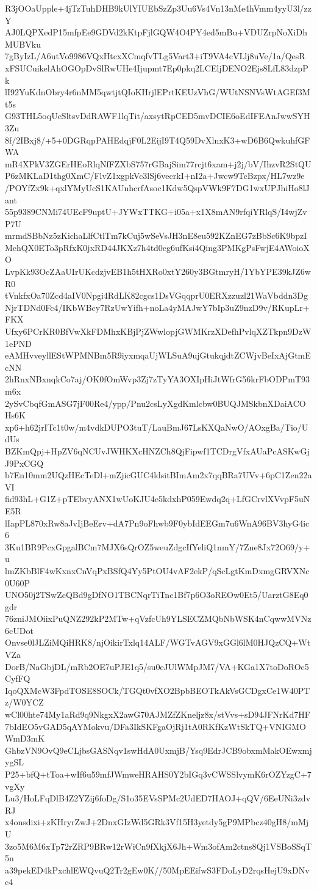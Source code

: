 R3jOOaUpple+4jTzTuhDHB9kUlYIUEbSzZp3Uu6Vs4Vn13nMe4hVmm4yyU3l/zzY
AJ0LQPXedP15mfpEe9GDVd2kKtpFjlGQW4O4PY4ed5mBu+VDUZrpNoXiDhMUBVku
7gByIzL/A6utVo9986VQxHtcxXCmqfvTLg5Vart3+iT9VA4cVLlj8uVe/1a/QesR
xFSUCuikelAhOGOpDvSlRwUHe4Ijupmt7Ep0pkq2LCEljDENO2Ejs8LfL83dzpPk
lI92YuKdnObry4r6nMM5qwtjtQIoKHrjlEPrtKEUzVhG/WUtNSNVsWtAGEf3Mt5s
G93THL5oqUcSltsvDdRAWF1lqTit/axsytRpCED5mvDCIE6oEdIFEAnJwwSYH3Zu
8f/2IBxj8/+5+0DGRqpPAHEdqjF0L2EijI9T4Q59DvXlnxK3+wD6B6QwkuhfGFWA
mR4XPkV3ZGErHEoRlqNfFZXbS757rGBajSim77rcjt6xam+j2j/bV/IhzvR2StQU
P6zMKLaD1thg0XmC/FlvZ1xgpkVc3lSj6vecrkI+nI2a+Jwcw9TcBzpx/HL7wz9e
/POYfZx9k+qxlYMyUcS1KAUnhcrfAsoc1Kdw5QspVWk9F7DG1wxUPJhiHo8lJant
55p9389CNMi74UEcF9uptU+JYWxTTKG+i05a+x1X8mAN9rfqiYRlqS/I4wjZvP7U
mrmdSBbNz5zKichaLlfCtlTm7kCuj5wSeVsJH3nE8eu592KZnEG7zBbSc6K9bpzI
MehQX0ETo3pRfxK0jxRD44JKXz7h4td0eg6ufKsi4Qing3PMKgPsFwjE4AWoioXO
LvpKk93OcZAaUIrUKcdzjvEB1h5tHXRo0xtY260y3BGtmryH/1YbYPE39kJZ6wR0
tVnkfxOa70Zcd4aIV0Npgi4RdLK82cgcs1DsVGqqprU0ERXzzuzl21WaVbddn3Dg
NjrTDNd0Fc4/IKbWBcy7RzUwYifh+noLa4yMAJwY7bIp3uZ9nzD9v/RKupLr+FKX
Ufxy6PCrKR0BfVwXkFDMhxKBjPjZWwlopjGWMKrzXDefhPvlqXZTkpn9DzW1ePND
eAMHvveyllEStWPMNBm5R9iyxmqaUjWLSuA9ujGtukqjdtZCWjvBeIxAjGtmEcNN
2hRnxNBxnqkCo7aj/OK0fOmWvp3Zj7zTyYA3OXIpHiJtWfrG56krFbODPmT93m6x
2ySvCbqfGmASG7jF00Re4/ypp/Pnu2csLyXgdKmlcbw0BUQJMSkbnXDaiACOHs6K
xp6+h62jrITc1t0w/m4vdkDUPO3tuT/LauBmJ67LsKXQaNwO/AOxgBa/Tio/UdUs
BZKmQpj+HpZV6qNCUvJWHKXcHNZCh8QjFipwf1TCDrgVfxAUaPcASKwGjJ9PxCGQ
b7En10mm2UQzHEcTeDl+mZjicGUC4ldsitBImAm2x7qqBRa7UVv+6pC1Zen22aVI
fid93hL+G1Z+pTEbvyANX1wUoKJU4e5kdxhP059Ewdq2q+LfGCrvlXVvpF5uNE5R
lIapPL870xRw8aJvIjBeErv+dA7Pn9oFhwb9F0ybIdEEGm7u6WnA96BV3hyG4ic6
3Ku1BR9PcxGpgalBCm7MJX6sQrOZ5weuZdgcIfYeliQ1nmY/7Zne8Jx72O69/y+u
lmZKbBlF4wKxnxCnVqPxBSfQ4Yy5PtOU4vAF2ekP/qScLgtKmDxmgGRVXNc0U60P
UNO50j2TSwZcQBd9gDfNO1TBCNqrTiTnc1Bf7p6O3oREOw0Et5/UarztG8Eq0gdr
76zniJMOiixPuQNZ292kP2MTw+qVzfcUh9YLSECZMQbNbWSK4nCqwwMVNz6cUDot
Onvse0lJLZiMQiHRK8/njOikirTxlq14ALF/WGTvAGV9xGGl6lM0HJQzCQ+WtVZa
DorB/NaGbjDL/mRb2OE7uPJE1q5/su0eJUlWMpJM7/VA+KGa1X7toDoROc5CyfFQ
IqoQXMcW3FpdTOSE8SOCk/TGQt0vfXO2BpbBEOTkAkVsGCDgxCe1W40PTz/W0YCZ
wCl00hte74My1aRd9q9NkgxX2awG70AJMZfZKneljz8x/stVvs+sD94JFNrKd7HF
7bIdEO5vGAD5qAYMokvu/DFa3IkSKFgaOjRj1tA0RKfKzWtSkTQ+VNIGMOWmD3mK
GhbzVN9OvQ9eCLjbsGASNqv1swHdA0UxmjB/Ysq9EdrJCB9obxmMakOEwxmjygSL
P25+bfQ+tToa+wIf6u59mfJWmweHRAHS0Y2bIGq3vCWSSlvymK6rOZYzgC+7vgXy
Lu3/HoLFqDlB4Z2YZij6foDg/S1o35EVsSPMc2UdED7HAOJ+qQV/6EeUNi3zdvRJ
x4onsdixi+zKHryrZwJ+2DnxGIzWd5GRk3Vf15H3yetdy5gP9MPbcz40gH8/mMjU
3zo5M6M6xTp72rZRP9BRw12rWiCn9fXkjX6Jh+Wm3ofAm2ctns8Qj1VSBoSSqT5n
a39pekED4kPxchlEWQvuQ2Tr2gEw0K//50MpEEifwS3FDoLyD2rqsHejU9xDNvc4
